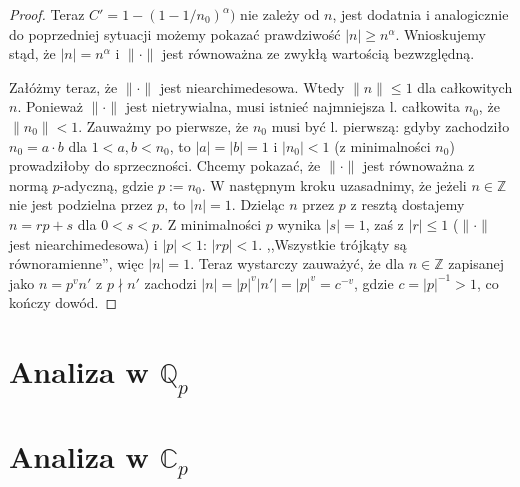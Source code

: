 \documentclass[a4paper, twoside]{extarticle}
\newcommand{\Q}{\mathbb{Q}}
\newcommand{\Z}{\mathbb{Z}}
\newcommand{\C}{\mathbb{C}}
\newcommand{\n}{\|\cdot\|}
\begin{document}
\begin{proof}
Teraz $C' = 1- (1-1/n_0)^\alpha)$ nie zależy od $n$, jest dodatnia i analogicznie do poprzedniej sytuacji możemy pokazać prawdziwość $|n| \ge n^\alpha$.
Wnioskujemy stąd, że $|n| = n^\alpha$ i $\n$ jest równoważna ze zwykłą wartością bezwzględną.


Załóżmy teraz, że $\n$ jest niearchimedesowa.
Wtedy $\|n\| \le 1$ dla całkowitych $n$.
Ponieważ $\n$ jest nietrywialna, musi istnieć najmniejsza l. całkowita $n_0$, że $\|n_0\| < 1$.
Zauważmy po pierwsze, że $n_0$ musi być l. pierwszą: gdyby zachodziło $n_0 = a \cdot b$ dla $1 < a,b < n_0$, to $|a| = |b| = 1$ i $|n_0| < 1$ (z minimalności $n_0$) prowadziłoby do sprzeczności.
Chcemy pokazać, że $\n$ jest równoważna z normą $p$-adyczną, gdzie $p := n_0$.
W następnym kroku uzasadnimy, że jeżeli $n \in \Z$ nie jest podzielna przez $p$, to $|n| = 1$.
Dzieląc $n$ przez $p$ z resztą dostajemy $n = rp + s$ dla $0 < s < p$.
Z minimalności $p$ wynika $|s| = 1$, zaś z $|r| \le 1$ ($\n$ jest niearchimedesowa) i $|p| < 1$: $|rp| < 1$.
,,Wszystkie trójkąty są równoramienne'', więc $|n| = 1$.
Teraz wystarczy zauważyć, że dla $n \in \Z$ zapisanej jako $n = p^v n'$ z $p \nmid n'$ zachodzi $|n| = |p|^v |n'| = |p|^v = c^{-v}$, gdzie $c = |p|^{-1} > 1$, co kończy dowód.
\end{proof}

\section{Analiza w $\Q_p$}

\section{Analiza w $\C_p$}
\end{document}
